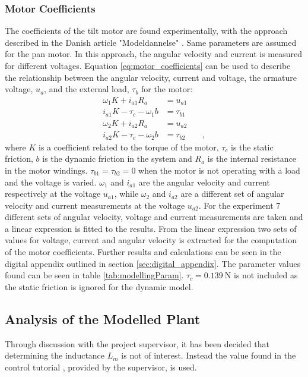 \documentclass[../../main.tex]{subfiles}
\begin{document}
\subsubsection*{ Motor Coefficients }
The coefficients of the tilt motor are found experimentally, with the approach described in the Danish article "Modeldannelse" \cite{PalleAndersenModeldannelse}. Same parameters are assumed for the pan motor. In this approach, the angular velocity and current is measured for different voltages. Equation \ref{eq:motor_coefficients} can be used to describe the relationship between the angular velocity, current and voltage, the armature voltage, $u_a$, and the external load, $\tau_b$ for the motor:
\begin{equation}\label{eq:motor_coefficients}
    \begin{split}
    \omega_{1} K + i_{a1} R_{a} &= u_{a1}  \\
    i_{a1} K - \tau_{c} - \omega_{1} b &= \tau_{b1} \\
    \omega_{2} K + i_{a2} R_{a} &= u_{a2} \\
    i_{a2} K - \tau_{c} - \omega_{2} b &= \tau_{b2} \qquad ,
    \end{split}
\end{equation}
where $K$ is a coefficient related to the torque of the motor, $\tau_{c}$ is the static friction, $b$ is the dynamic friction in the system and $R_{a}$ is the internal resistance in the motor windings. $\tau_{b1} = \tau_{b2} = 0$ when the motor is not operating with a load and the voltage is varied. $\omega_{1}$ and $i_{a1}$ are the angular velocity and current respectively at the voltage $u_{a1}$, while $\omega_{2}$ and $i_{a2}$ are a different set of angular velocity and current measurements at the voltage $u_{a2}$. For the experiment 7 different sets of angular velocity, voltage and current measurements are taken and a linear expression is fitted to the results. From the linear expression two sets of values for voltage, current and angular velocity is extracted for the computation of the motor coefficients. Further results and calculations can be seen in the digital appendix outlined in section \ref{sec:digital_appendix}. The parameter values found can be seen in table \ref{tab:modellingParam}. $\tau_c = \SI{0.139}{\newton}$ is not included as the static friction is ignored for the dynamic model.





\subsection{Analysis of the Modelled Plant}
Through discussion with the project supervisor, it has been decided that determining the inductance $L_m$ is not of interest. Instead the value found in the control tutorial \cite{universityofmichigan2019}, provided by the supervisor, is used.
\end{document}
